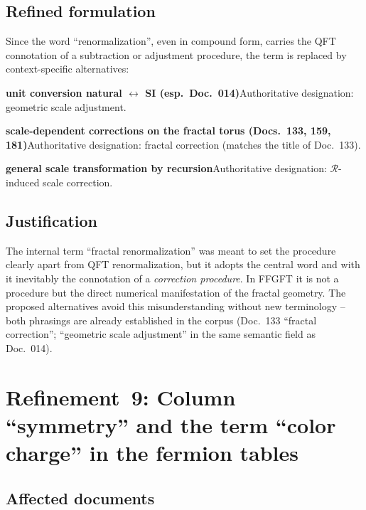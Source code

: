 \subsection*{Refined formulation}

Since the word \enquote{renormalization}, even in compound form, carries the
QFT connotation of a subtraction or adjustment procedure, the term is replaced
by context-specific alternatives:

\smallskip\noindent \textbf{unit conversion natural $\leftrightarrow$ SI (esp.\ Doc.~014)}\quad Authoritative designation: geometric scale adjustment.

\smallskip\noindent \textbf{scale-dependent corrections on the fractal torus (Docs.~133, 159, 181)}\quad Authoritative designation: fractal correction (matches the title of Doc.~133).

\smallskip\noindent \textbf{general scale transformation by recursion}\quad Authoritative designation: $\mathcal{R}$-induced scale correction.

\medskip


\subsection*{Justification}

The internal term \enquote{fractal renormalization} was meant to set the
procedure clearly apart from QFT renormalization, but it adopts the central
word and with it inevitably the connotation of a \emph{correction procedure}.
In FFGFT it is not a procedure but the direct numerical manifestation of the
fractal geometry. The proposed alternatives avoid this misunderstanding
without new terminology -- both phrasings are already established in the corpus
(Doc.~133 \enquote{fractal correction}; \enquote{geometric scale adjustment}
in the same semantic field as Doc.~014).

\section{\texorpdfstring{Refinement~9: Column \enquote{symmetry} and the term \enquote{color charge} in the fermion tables}{Refinement 9: Column symmetry and the term color charge in the fermion tables}}

\subsection*{Affected documents}

